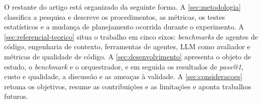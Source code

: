 O restante do artigo está organizado da seguinte forma. A
\autoref{sec:metodologia} classifica a pesquisa e descreve os procedimentos, as
métricas, os testes estatísticos e a mudança de planejamento ocorrida durante o
experimento. A \autoref{sec:referencial-teorico} situa o trabalho em cinco
eixos: \textit{benchmarks} de agentes de código, engenharia de contexto,
ferramentas de agentes, LLM como avaliador e métricas de qualidade de código. A
\autoref{sec:desenvolvimento} apresenta o objeto de estudo, o \textit{benchmark}
e o orquestrador, e em seguida os resultados de \textit{pass@1}, custo e
qualidade, a discussão e as ameaças à validade. A \autoref{sec:consideracoes}
retoma os objetivos, resume as contribuições e as limitações e aponta trabalhos
futuros.
